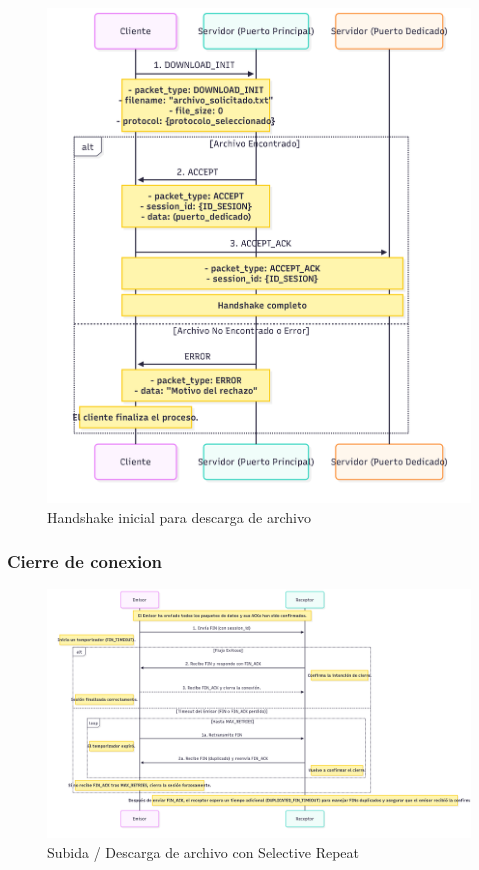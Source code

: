 \begin{figure}[H]
    \centering
    \includegraphics[width=1\linewidth]{images/DOWNLOAD_HANDSHAKE}
    \caption{Handshake inicial para descarga de archivo}
    \label{fig:download_handshake}
\end{figure}

\subsubsection{Cierre de conexion}

\begin{figure}[H]
    \centering
    \includegraphics[width=1\linewidth]{images/FIN}
    \caption{Subida / Descarga de archivo con Selective Repeat}
    \label{fig:fin_transfer}
\end{figure}

